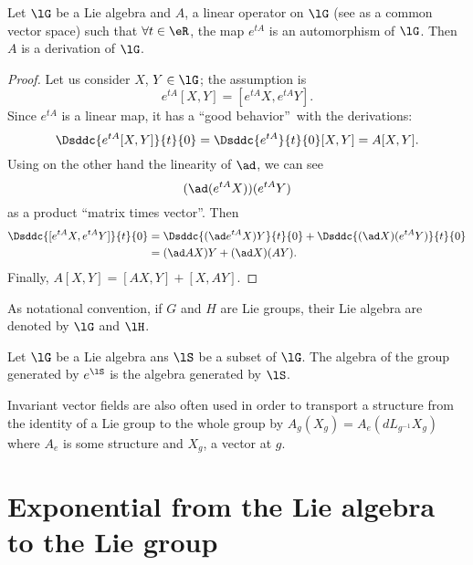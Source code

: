 \begin{lemma}
Let $\lG$ be a Lie algebra and $A$, a linear operator on $\lG$ (see as a common vector space) such that $\forall t\in\eR$, the map $e^{tA}$ is an automorphism of $\lG$. Then $A$ is a derivation of $\lG$.
\label{lem:autom_derr}
\end{lemma}

\begin{proof}
Let us consider $X$, $Y\in\lG$;  the assumption is
\[
  e^{tA}[X,Y]=[e^{tA}X,e^{tA}Y].
\]
Since $e^{tA}$ is a linear map, it has a ``good behavior''\ with the derivations:
\[
\Dsddc{e^{tA}[X,Y]}{t}{0}=\Dsddc{e^{tA}}{t}{0}[X,Y]=A[X,Y].
\]
Using on the other hand the linearity of $\ad$, we can see
\[
  (\ad(e^{tA}X))(e^{tA}Y)
\]
as a product ``matrix times vector''. Then
\begin{equation}
\begin{split}
  \Dsddc{[e^{tA}X,e^{tA}Y]}{t}{0}&=\Dsddc{(\ad e^{tA}X)Y}{t}{0}+\Dsddc{(\ad X)(e^{tA}Y)}{t}{0}\\
                                 &=(\ad AX)Y+(\ad X)(AY).
\end{split}
\end{equation}
Finally, $A[X,Y]=[AX,Y]+[X,AY]$.

\end{proof}

As notational convention, if $G$ and $H$ are Lie groups, their Lie algebra are denoted by $\lG$ and $\lH$.

\begin{lemma}		\label{LemAlgEtGroupesGenere}
	Let $\lG$ be a Lie algebra ans $\lS$ be a subset of $\lG$. The algebra of the group generated by $ e^{\lS}$ is the algebra generated by $\lS$.
\end{lemma}

Invariant vector fields are also often used in order to transport a structure from the identity of a Lie group to the whole group by $A_g(X_g)=A_e(dL_{g^{-1}}X_g)$ where $A_e$ is some structure and $X_g$, a vector at $g$.


\section{Exponential from the Lie algebra to the Lie group}

